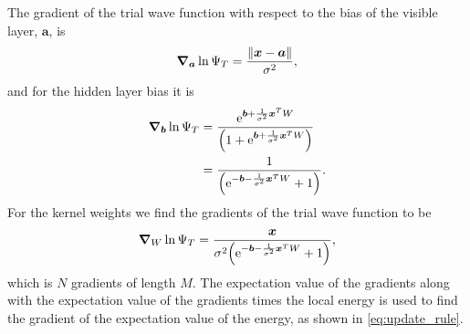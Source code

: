 The gradient of the trial wave function with respect to the bias of the visible layer, $\bm{a}$, is 
\begin{equation}
    \grad_{\bm{a}}\ln{\Psi_T} = \frac{\norm{\bm{x}-\bm{a}}}{\sigma^2}, 
\end{equation}
and for the hidden layer bias it is 
\begin{align}
    \grad_{\bm{b}}\ln{\Psi_T} &= \frac{\mathrm{e}^{\bm{b} + \frac{1}{\sigma^2}\bm{x}^T W}}{\qty(1+\mathrm{e}^{\bm{b} + \frac{1}{\sigma^2}\bm{x}^T W})} \\
    &= \frac{1}{\qty(\mathrm{e}^{-\bm{b} - \frac{1}{\sigma^2}\bm{x}^T W}+1)}. 
\end{align}
For the kernel weights we find the gradients of the trial wave function to be 
\begin{equation}
    \grad_{W}\ln{\Psi_T} = \frac{\bm{x}}{\sigma^2\qty(\mathrm{e}^{-\bm{b}-\frac{1}{\sigma^2}\bm{x}^T W}+1)}, 
\end{equation}
which is $N$ gradients of length $M$. The expectation value of the gradients along with the expectation value of the gradients times the local energy is used to find the gradient of the expectation value of the energy, as shown in \autoref{eq:update_rule}.



